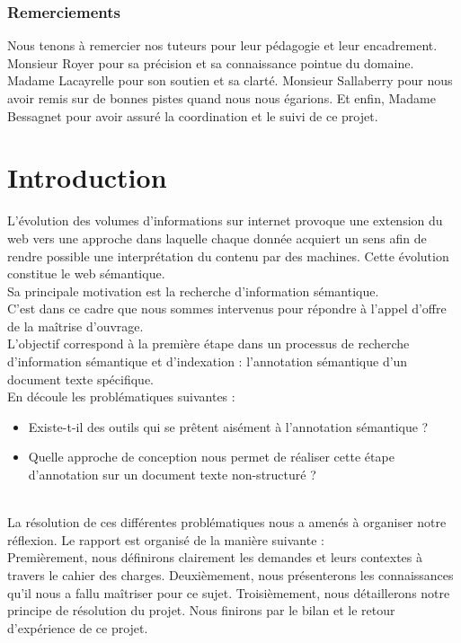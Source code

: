 \documentclass[a4paper, 11pt]{report}
\begin{document}
\section*{Remerciements}
Nous tenons à remercier nos tuteurs pour leur pédagogie et leur encadrement. Monsieur Royer pour sa précision et sa connaissance pointue du domaine. Madame Lacayrelle pour son soutien et sa clarté. Monsieur Sallaberry pour nous avoir remis sur de bonnes pistes quand nous nous égarions. Et enfin, Madame Bessagnet pour avoir assuré la coordination et le suivi de ce projet.
\tableofcontents

\part{Introduction}
L'évolution des volumes d'informations sur internet provoque une extension du web vers une approche dans laquelle chaque donnée acquiert un sens afin de rendre possible une interprétation du contenu par des machines. Cette évolution constitue le web sémantique.\\
Sa principale motivation  est la recherche d’information sémantique.\\

C'est dans ce cadre que nous sommes intervenus pour répondre à l'appel d'offre de la maîtrise d'ouvrage. \\
L'objectif correspond à la première étape dans un processus de recherche d'information sémantique et d'indexation : l'annotation sémantique d'un document texte spécifique.\\

En découle les problématiques suivantes :
\begin{itemize}
\item Existe-t-il des outils qui se prêtent aisément à l'annotation sémantique ?
\item Quelle approche de conception nous permet de réaliser cette étape d'annotation sur un document texte non-structuré ?
\end{itemize}
    ~\\
    
La résolution de ces différentes problématiques nous a amenés à organiser notre réflexion. Le rapport est organisé de la manière suivante : \\
Premièrement, nous définirons clairement les demandes et leurs contextes à travers le cahier des charges. Deuxièmement, nous présenterons les connaissances qu'il nous a fallu maîtriser pour ce sujet. Troisièmement, nous détaillerons notre principe de résolution du projet. Nous finirons par le bilan et le retour d’expérience de ce projet.
\end{document}
